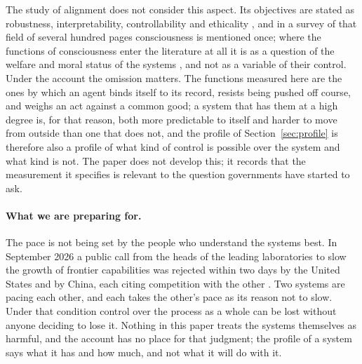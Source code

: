 The study of alignment does not consider this aspect. Its objectives are stated as robustness,
interpretability, controllability and ethicality \citep{ji2023}, and in a survey of that field of
several hundred pages consciousness is mentioned once; where the functions of consciousness enter the
literature at all it is as a question of the welfare and moral status of the systems
\citep{long2024}, and not as a variable of their control. Under the account the omission matters. The
functions measured here are the ones by which an agent binds itself to its record, resists being
pushed off course, and weighs an act against a common good; a system that has them at a high degree
is, for that reason, both more predictable to itself and harder to move from outside than one that
does not, and the profile of Section~\ref{sec:profile} is therefore also a profile of what kind of
control is possible over the system and what kind is not. The paper does not develop this; it records
that the measurement it specifies is relevant to the question governments have started to ask.

\paragraph{What we are preparing for.}
The pace is not being set by the people who understand the systems best. In September 2026 a public
call from the heads of the leading laboratories to slow the growth of frontier capabilities was
rejected within two days by the United States and by China, each citing competition with the other
\citep{amodei2026,wapo2026,nbc2026}. Two systems are pacing each other, and each takes the other's
pace as its reason not to slow. Under that condition control over the process as a whole can be lost
without anyone deciding to lose it. Nothing in this paper treats the systems themselves
as harmful, and the account has no place for that judgment; the profile of a system says what it has
and how much, and not what it will do with it.

